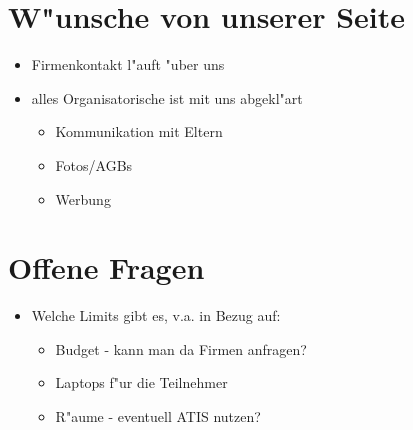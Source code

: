 \documentclass[12pt]{article}
\begin{document}
\section{W"unsche von unserer Seite}
\begin{itemize}
\item Firmenkontakt l"auft "uber uns
\item alles Organisatorische ist mit uns abgekl"art
\begin{itemize}
\item Kommunikation mit Eltern
\item Fotos/AGBs
\item Werbung
\end{itemize}
\end{itemize}

\section{Offene Fragen}
\begin{itemize}
\item Welche Limits gibt es, v.a. in Bezug auf:
\begin{itemize}
\item Budget - kann man da Firmen anfragen?
\item Laptops f"ur die Teilnehmer
\item R"aume - eventuell ATIS nutzen?
\end{itemize}
\end{itemize}
\end{document}
